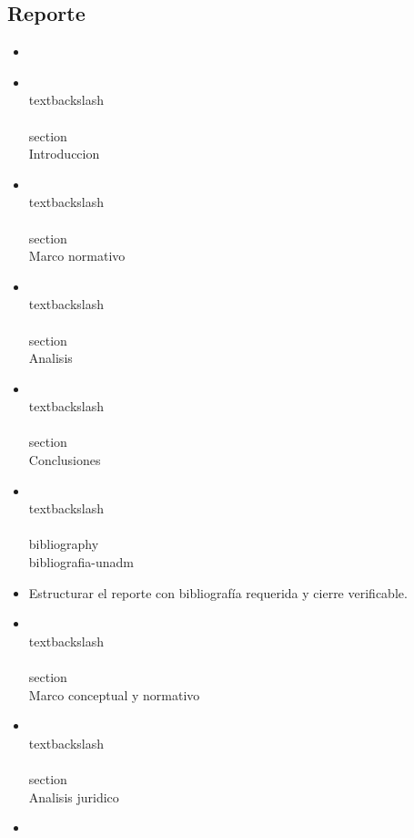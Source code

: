 \documentclass[12pt]{article}
\begin{document}
\subsection*{Reporte}
\begin{itemize}[leftmargin=*]
  \item \\%
  \item \\textbackslash\\{\\}section\\{Introduccion\\}
  \item \\textbackslash\\{\\}section\\{Marco normativo\\}
  \item \\textbackslash\\{\\}section\\{Analisis\\}
  \item \\textbackslash\\{\\}section\\{Conclusiones\\}
  \item \\textbackslash\\{\\}bibliography\\{bibliografia-unadm\\}
  \item Estructurar el reporte con bibliografía requerida y cierre verificable.
  \item \\textbackslash\\{\\}section\\{Marco conceptual y normativo\\}
  \item \\textbackslash\\{\\}section\\{Analisis juridico\\}
  \item \\%

\end{itemize}
\end{document}

